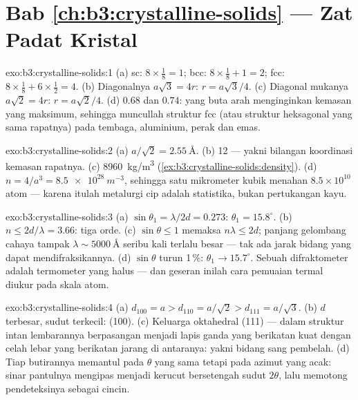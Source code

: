 \section*{Bab \ref{ch:b3:crystalline-solids} --- Zat Padat Kristal}

\begin{solution}{exo:b3:crystalline-solids:1}
(a) sc: $8\times\tfrac18 = 1$; bcc: $8\times\tfrac18 + 1 = 2$;
fcc: $8\times\tfrac18 + 6\times\tfrac12 = 4$. (b) Diagonalnya
$a\sqrt3 = 4r$: $r = a\sqrt3/4$. (c) Diagonal mukanya $a\sqrt2 = 4r$:
$r = a\sqrt2/4$. (d) $0.68$ dan $0.74$:  yang buta arah
menginginkan kemasan yang maksimum, sehingga muncullah struktur fcc
(atau struktur heksagonal yang sama rapatnya) pada tembaga, aluminium,
perak dan emas.
\end{solution}

\begin{solution}{exo:b3:crystalline-solids:2}
(a) $a/\sqrt2 = \qty{2.55}{\angstrom}$. (b) 12 --- yakni
bilangan koordinasi kemasan rapatnya. (c) \qty{8960}{kg/m^3}
(\cref{ex:b3:crystalline-solids:density}). (d) $n = 4/a^3 =
\qty{8.5e28}{m^{-3}}$, sehingga satu mikrometer kubik menahan
$8.5\times10^{10}$ atom --- karena itulah metalurgi cip adalah
statistika, bukan pertukangan kayu.
\end{solution}

\begin{solution}{exo:b3:crystalline-solids:3}
(a) $\sin\theta_1 = \lambda/2d = 0.273$: $\theta_1 =
15.8^\circ$. (b) $n \le 2d/\lambda = 3.66$: tiga orde. (c)
$\sin\theta \le 1$ memaksa $n\lambda \le 2d$; panjang gelombang cahaya
tampak $\lambda \sim \qty{5000}{\angstrom}$ seribu kali terlalu besar
--- tak ada jarak bidang  yang dapat mendifraksikannya. (d) $\sin\theta$
turun 1\,\%: $\theta_1 \to 15.7^\circ$. Sebuah difraktometer adalah
termometer yang halus --- dan geseran inilah cara pemuaian termal
diukur pada skala atom.
\end{solution}

\begin{solution}{exo:b3:crystalline-solids:4}
(a) $d_{100} = a > d_{110} = a/\sqrt2 > d_{111} = a/\sqrt3$. (b)
$d$ terbesar, sudut terkecil: (100). (c) Keluarga oktahedral (111)
--- dalam struktur intan lembarannya berpasangan menjadi lapis ganda
yang berikatan kuat dengan celah lebar yang berikatan jarang di antaranya:
yakni bidang sang pembelah. (d) Tiap butirannya memantul pada $\theta$ yang sama
tetapi pada azimut yang acak: sinar pantulnya mengipas menjadi kerucut
bersetengah sudut $2\theta$, lalu memotong pendeteksinya sebagai cincin.
\end{solution}


